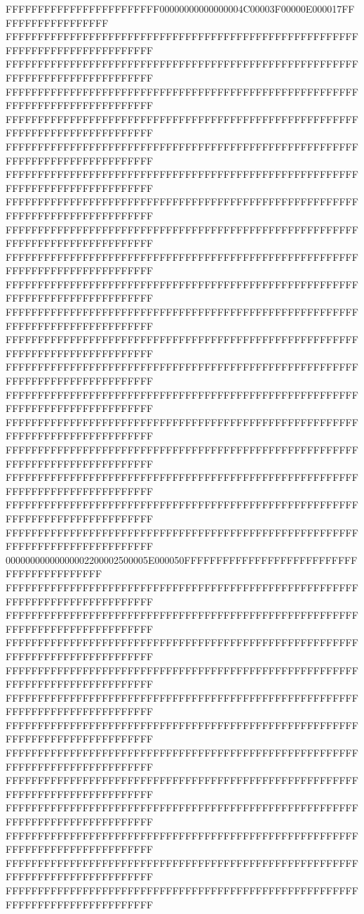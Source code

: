 FFFFFFFFFFFFFFFFFFFFFFFF00000000000000004C00003F00000E000017FFFFFFFFFFFFFFFFFF
FFFFFFFFFFFFFFFFFFFFFFFFFFFFFFFFFFFFFFFFFFFFFFFFFFFFFFFFFFFFFFFFFFFFFFFFFFFFFF
FFFFFFFFFFFFFFFFFFFFFFFFFFFFFFFFFFFFFFFFFFFFFFFFFFFFFFFFFFFFFFFFFFFFFFFFFFFFFF
FFFFFFFFFFFFFFFFFFFFFFFFFFFFFFFFFFFFFFFFFFFFFFFFFFFFFFFFFFFFFFFFFFFFFFFFFFFFFF
FFFFFFFFFFFFFFFFFFFFFFFFFFFFFFFFFFFFFFFFFFFFFFFFFFFFFFFFFFFFFFFFFFFFFFFFFFFFFF
FFFFFFFFFFFFFFFFFFFFFFFFFFFFFFFFFFFFFFFFFFFFFFFFFFFFFFFFFFFFFFFFFFFFFFFFFFFFFF
FFFFFFFFFFFFFFFFFFFFFFFFFFFFFFFFFFFFFFFFFFFFFFFFFFFFFFFFFFFFFFFFFFFFFFFFFFFFFF
FFFFFFFFFFFFFFFFFFFFFFFFFFFFFFFFFFFFFFFFFFFFFFFFFFFFFFFFFFFFFFFFFFFFFFFFFFFFFF
FFFFFFFFFFFFFFFFFFFFFFFFFFFFFFFFFFFFFFFFFFFFFFFFFFFFFFFFFFFFFFFFFFFFFFFFFFFFFF
FFFFFFFFFFFFFFFFFFFFFFFFFFFFFFFFFFFFFFFFFFFFFFFFFFFFFFFFFFFFFFFFFFFFFFFFFFFFFF
FFFFFFFFFFFFFFFFFFFFFFFFFFFFFFFFFFFFFFFFFFFFFFFFFFFFFFFFFFFFFFFFFFFFFFFFFFFFFF
FFFFFFFFFFFFFFFFFFFFFFFFFFFFFFFFFFFFFFFFFFFFFFFFFFFFFFFFFFFFFFFFFFFFFFFFFFFFFF
FFFFFFFFFFFFFFFFFFFFFFFFFFFFFFFFFFFFFFFFFFFFFFFFFFFFFFFFFFFFFFFFFFFFFFFFFFFFFF
FFFFFFFFFFFFFFFFFFFFFFFFFFFFFFFFFFFFFFFFFFFFFFFFFFFFFFFFFFFFFFFFFFFFFFFFFFFFFF
FFFFFFFFFFFFFFFFFFFFFFFFFFFFFFFFFFFFFFFFFFFFFFFFFFFFFFFFFFFFFFFFFFFFFFFFFFFFFF
FFFFFFFFFFFFFFFFFFFFFFFFFFFFFFFFFFFFFFFFFFFFFFFFFFFFFFFFFFFFFFFFFFFFFFFFFFFFFF
FFFFFFFFFFFFFFFFFFFFFFFFFFFFFFFFFFFFFFFFFFFFFFFFFFFFFFFFFFFFFFFFFFFFFFFFFFFFFF
FFFFFFFFFFFFFFFFFFFFFFFFFFFFFFFFFFFFFFFFFFFFFFFFFFFFFFFFFFFFFFFFFFFFFFFFFFFFFF
FFFFFFFFFFFFFFFFFFFFFFFFFFFFFFFFFFFFFFFFFFFFFFFFFFFFFFFFFFFFFFFFFFFFFFFFFFFFFF
FFFFFFFFFFFFFFFFFFFFFFFFFFFFFFFFFFFFFFFFFFFFFFFFFFFFFFFFFFFFFFFFFFFFFFFFFFFFFF
00000000000000002200002500005E000050FFFFFFFFFFFFFFFFFFFFFFFFFFFFFFFFFFFFFFFFFF
FFFFFFFFFFFFFFFFFFFFFFFFFFFFFFFFFFFFFFFFFFFFFFFFFFFFFFFFFFFFFFFFFFFFFFFFFFFFFF
FFFFFFFFFFFFFFFFFFFFFFFFFFFFFFFFFFFFFFFFFFFFFFFFFFFFFFFFFFFFFFFFFFFFFFFFFFFFFF
FFFFFFFFFFFFFFFFFFFFFFFFFFFFFFFFFFFFFFFFFFFFFFFFFFFFFFFFFFFFFFFFFFFFFFFFFFFFFF
FFFFFFFFFFFFFFFFFFFFFFFFFFFFFFFFFFFFFFFFFFFFFFFFFFFFFFFFFFFFFFFFFFFFFFFFFFFFFF
FFFFFFFFFFFFFFFFFFFFFFFFFFFFFFFFFFFFFFFFFFFFFFFFFFFFFFFFFFFFFFFFFFFFFFFFFFFFFF
FFFFFFFFFFFFFFFFFFFFFFFFFFFFFFFFFFFFFFFFFFFFFFFFFFFFFFFFFFFFFFFFFFFFFFFFFFFFFF
FFFFFFFFFFFFFFFFFFFFFFFFFFFFFFFFFFFFFFFFFFFFFFFFFFFFFFFFFFFFFFFFFFFFFFFFFFFFFF
FFFFFFFFFFFFFFFFFFFFFFFFFFFFFFFFFFFFFFFFFFFFFFFFFFFFFFFFFFFFFFFFFFFFFFFFFFFFFF
FFFFFFFFFFFFFFFFFFFFFFFFFFFFFFFFFFFFFFFFFFFFFFFFFFFFFFFFFFFFFFFFFFFFFFFFFFFFFF
FFFFFFFFFFFFFFFFFFFFFFFFFFFFFFFFFFFFFFFFFFFFFFFFFFFFFFFFFFFFFFFFFFFFFFFFFFFFFF
FFFFFFFFFFFFFFFFFFFFFFFFFFFFFFFFFFFFFFFFFFFFFFFFFFFFFFFFFFFFFFFFFFFFFFFFFFFFFF
FFFFFFFFFFFFFFFFFFFFFFFFFFFFFFFFFFFFFFFFFFFFFFFFFFFFFFFFFFFFFFFFFFFFFFFFFFFFFF
